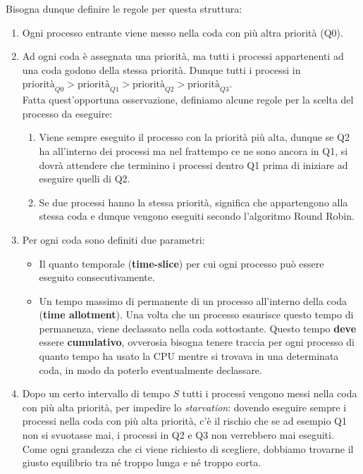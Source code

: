 \documentclass[12pt]{report}
\begin{document}
	Bisogna dunque definire le regole per questa struttura:
	\begin{enumerate}
		\item Ogni processo entrante viene messo nella coda con più altra priorità (Q0).
		
		\item Ad ogni coda è assegnata una priorità, ma tutti i processi appartenenti ad una coda godono della stessa priorità. Dunque tutti i processi in $\text{priorità}_{Q0} > \text{priorità}_{Q1} > \text{priorità}_{Q2} > \text{priorità}_{Q3}$.\\
		Fatta quest'opportuna osservazione, definiamo alcune regole per la scelta del processo da eseguire:
		\begin{enumerate}
			\item Viene sempre eseguito il processo con la priorità più alta, dunque se Q2 ha all'interno dei processi ma nel frattempo ce ne sono ancora in Q1, si dovrà attendere che terminino i processi dentro Q1 prima di iniziare ad eseguire quelli di Q2.
			
			\item Se due processi hanno la stessa priorità, significa che appartengono alla stessa coda e dunque vengono eseguiti secondo l'algoritmo Round Robin.
		\end{enumerate}
		
		\item Per ogni coda sono definiti due parametri:
		\begin{itemize}
			\item Il quanto temporale (\textbf{time-slice}) per cui ogni processo può essere eseguito consecutivamente.
			
			\item Un tempo massimo di permanente di un processo all'interno della coda (\textbf{time allotment}). Una volta che un processo esaurisce questo tempo di permanenza, viene declassato nella coda sottostante. Questo tempo \textbf{deve} essere \textbf{cumulativo}, ovverosia bisogna tenere traccia per ogni processo di quanto tempo ha usato la CPU mentre si trovava in una determinata coda, in modo da poterlo eventualmente declassare.
		\end{itemize}
		
		\item Dopo un certo intervallo di tempo $S$ tutti i processi vengono messi nella coda con più alta priorità, per impedire lo \textit{starvation}: dovendo eseguire sempre i processi nella coda con più alta priorità, c'è il rischio che se ad esempio Q1 non si svuotasse mai, i processi in Q2 e Q3 non verrebbero mai eseguiti. Come ogni grandezza che ci viene richiesto di scegliere, dobbiamo trovarne il giusto equilibrio tra né troppo lunga e né troppo corta.
	\end{enumerate}
	
\end{document}
